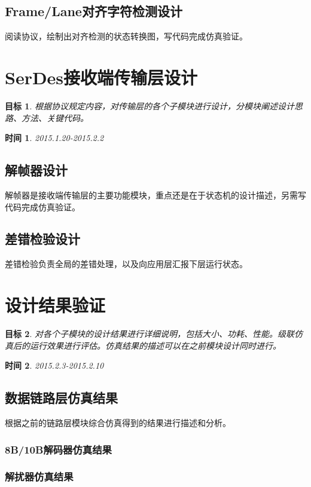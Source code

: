 \documentclass[UTF8]{ctexart}
\newtheorem{aim}{目标}
\newtheorem{deadline}{时间}
\begin{document}
\subsection{Frame/Lane对齐字符检测设计}
阅读协议，绘制出对齐检测的状态转换图，写代码完成仿真验证。

\section{SerDes接收端传输层设计}

\begin{aim}{}根据协议规定内容，对传输层的各个子模块进行设计，分模块阐述设计思路、方法、关键代码。\end{aim}
\begin{deadline}{}2015.1.20-2015.2.2\end{deadline}

\subsection{解帧器设计}
解帧器是接收端传输层的主要功能模块，重点还是在于状态机的设计描述，另需写代码完成仿真验证。

\subsection{差错检验设计}
差错检验负责全局的差错处理，以及向应用层汇报下层运行状态。

\section{设计结果验证}

\begin{aim}{}对各个子模块的设计结果进行详细说明，包括大小、功耗、性能。级联仿真后的运行效果进行评估。仿真结果的描述可以在之前模块设计同时进行。\end{aim}
\begin{deadline}{}2015.2.3-2015.2.10\end{deadline}

\subsection{数据链路层仿真结果}
根据之前的链路层模块综合仿真得到的结果进行描述和分析。
\subsubsection{8B/10B解码器仿真结果}
\subsubsection{解扰器仿真结果}
\end{document}
